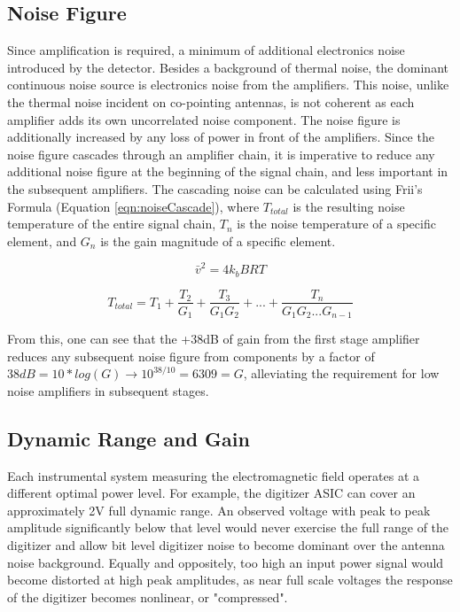 	\subsection{Noise Figure} 
	Since amplification is required, a minimum of additional electronics noise introduced by the detector.  Besides a background of thermal noise, the dominant continuous noise source is electronics noise from the amplifiers. This noise, unlike the thermal noise incident on co-pointing antennas, is not coherent as each amplifier adds its own uncorrelated noise component.  The noise figure is additionally increased by any loss of power in front of the amplifiers.  Since the noise figure cascades through an amplifier chain, it is imperative to reduce any additional noise figure at the beginning of the signal chain, and less important in the subsequent amplifiers.  The cascading noise can be calculated using Frii's Formula (Equation \ref{eqn:noiseCascade}), where $T_{total}$ is the resulting noise temperature of the entire signal chain, $T_{n}$ is the noise temperature of a specific element, and $G_{n}$ is the gain magnitude of a specific element.
	
\begin{equation}
	\bar{v}^{2} = 4k_{b}BRT
	\label{eqn:JohnsonNyquistNoise}
\end{equation}

	
\begin{equation}
	\label{eqn:noiseCascade}
	T_{total} = T_{1} + \frac{T_{2}}{G_{1}} + \frac{T_{3}}{G_{1}G_{2}} + ... + \frac{T_{n}}{G_{1}G_{2}...G_{n-1}}
\end{equation}
	
	From this, one can see that the +38dB of gain from the first stage amplifier reduces any subsequent noise figure from components by a factor of $38dB = 10*log(G) \rightarrow 10^{38/10} =  6309 = G$, alleviating the requirement for low noise amplifiers in subsequent stages.


	\subsection{Dynamic Range and Gain}
		Each instrumental system measuring the electromagnetic field operates at a different optimal power level.  For example, the digitizer ASIC can cover an approximately 2V full dynamic range.  An observed voltage with peak to peak amplitude significantly below that level would never exercise the full range of the digitizer and allow bit level digitizer noise to become dominant over the antenna noise background.  Equally and oppositely, too high an input power signal would become distorted at high peak amplitudes, as near full scale voltages the response of the digitizer becomes nonlinear, or "compressed". 
		
